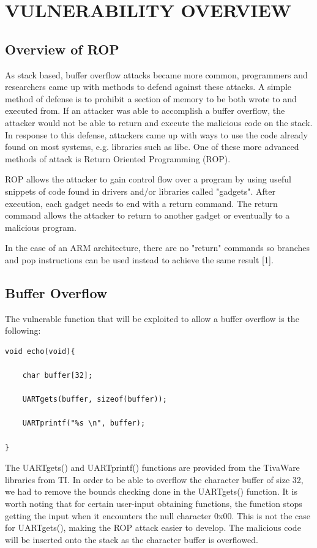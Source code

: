 \documentclass[letterpaper, 10 pt, conference]{ieeeconf}  %
\begin{document}
\section{VULNERABILITY OVERVIEW}
     

\subsection{Overview of ROP}

As stack based, buffer overflow attacks became more common, programmers and researchers came up with methods to defend against these attacks.  A simple method of defense is to prohibit a section of memory to be both wrote to and executed from.  If an attacker was able to accomplish a buffer overflow, the attacker would not be able to return and execute the malicious code on the stack.  In response to this defense, attackers came up with ways to use the code already found on most systems, e.g. libraries such as libc.  One of these more advanced methods of attack is Return Oriented Programming (ROP).

ROP allows the attacker to gain control flow over a program by using useful snippets of code found in drivers and/or libraries called "gadgets".  After execution, each gadget needs to end with a return command.  The return command allows the attacker to return to another gadget or eventually to a malicious program.

In the case of an ARM architecture, there are no "return" commands so branches and pop instructions can be used instead to achieve the same result [1].  

\subsection{Buffer Overflow}

The vulnerable function that will be exploited to allow a buffer overflow is the following:

\begin{lstlisting}
void echo(void){
	
	char buffer[32];
	
	UARTgets(buffer, sizeof(buffer));
	
	UARTprintf("%s \n", buffer);
	
}
\end{lstlisting}

\noindent
The UARTgets() and UARTprintf() functions are provided from the TivaWare libraries from TI.  In order to be able to overflow the character buffer of size 32, we had to remove the bounds checking done in the UARTgets() function.  It is worth noting that for certain user-input obtaining functions, the function stops getting the input when it encounters the null character $0$x$00$.  This is not the case for UARTgets(), making the ROP attack easier to develop.  The malicious code will be inserted onto the stack as the character buffer is overflowed.
\end{document}
